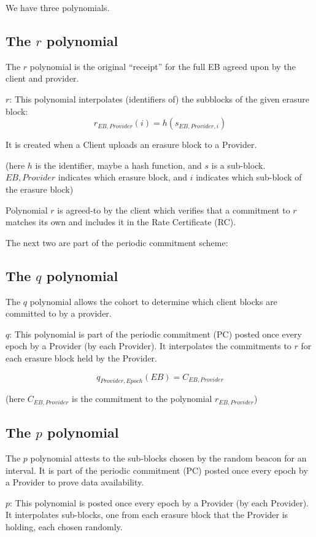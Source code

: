 \documentclass{article}
\begin{document}
We have three polynomials.

\subsection{The $r$ polynomial}
The $r$ polynomial is the original “receipt” for the full EB agreed upon by the client and provider.

$r$:  This polynomial interpolates (identifiers of) the subblocks of the given erasure block:
$$r_{EB,Provider}(i)=h\left(s_{EB,Provider,i}\right)$$

It is created when a Client uploads an erasure block to a Provider.

(here $h$ is the identifier, maybe a hash function, and $s$ is a sub-block. $EB,Provider$ indicates which erasure block, and $i$ indicates which sub-block of the erasure block)

Polynomial $r$ is agreed-to by the client which verifies that a commitment to $r$ matches its own and includes it in the Rate Certificate (RC).

The next two are part of the periodic commitment scheme:

\subsection{The $q$ polynomial}
The $q$ polynomial allows the cohort to determine which client blocks are committed to by a provider.

$q$: This polynomial is part of the periodic commitment (PC) posted once every epoch by a Provider (by each Provider). It interpolates the commitments to $r$ for each erasure block held by the Provider.

$$q_{Provider,Epoch}(EB)=C_{EB,Provider}$$

(here $C_{EB,Provider}$ is the commitment to the polynomial $r_{EB,Provider}$)

\subsection{The $p$ polynomial}
The $p$ polynomial attests to the sub-blocks chosen by the random beacon for an interval.  It is part of the periodic commitment (PC) posted once every epoch by a Provider to prove data availability.

$p$: This polynomial is posted once every epoch by a Provider (by each Provider). It interpolates sub-blocks, one from each erasure block that the Provider is holding, each chosen randomly. 
\end{document}
